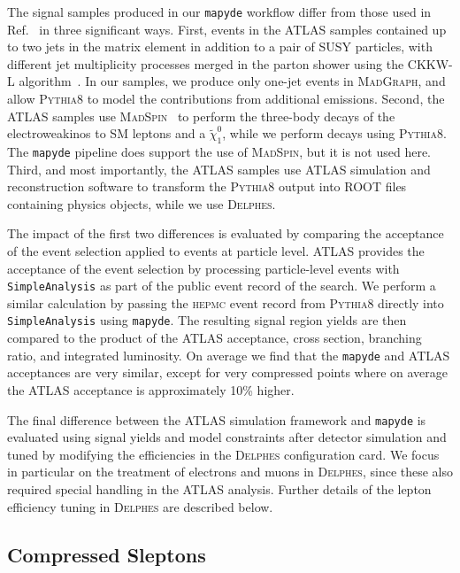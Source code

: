 \documentclass{article}
\newcommand{\chioz}{\ensuremath{\widetilde{\chi}_{1}^{0}}}
\newcommand{\mapyde}{\texttt{mapyde}}
\newcommand{\simpleanalysis}{\texttt{SimpleAnalysis}}
\newcommand{\madgraph}{\textsc{MadGraph}}
\newcommand{\madspin}{\textsc{MadSpin}}
\newcommand{\pythia}{\textsc{Pythia8}}
\newcommand{\delphes}{\textsc{Delphes}}
\newcommand{\hepmc}{\textsc{hepmc}}
\begin{document}
The signal samples produced in our \mapyde{} workflow differ from those used in Ref.~\cite{ATLAS:2019lng} in three significant ways.  First, events in the ATLAS samples contained up to two jets in the matrix element in addition to a pair of SUSY particles, with different jet multiplicity processes merged in the parton shower using the CKKW-L algorithm~\cite{Lonnblad:2011xx}.  In our samples, we produce only one-jet events in \madgraph, and allow \pythia{} to model the contributions from additional emissions.  Second, the ATLAS samples use \madspin{}~\cite{Artoisenet:2012st} to perform the three-body decays of the electroweakinos to SM leptons and a \chioz, while we perform decays using \pythia.  The \mapyde{} pipeline does support the use of \madspin, but it is not used here.  Third, and most importantly, the ATLAS samples use ATLAS simulation and reconstruction software to transform the \pythia{} output into ROOT files containing physics objects, while we use \delphes.

The impact of the first two differences is evaluated by comparing the acceptance of the event selection applied to events at particle level.  ATLAS provides the acceptance of the event selection by processing particle-level events with \simpleanalysis{} as part of the public event record of the search.  We perform a similar calculation by passing the \hepmc{} event record from \pythia{} directly into \simpleanalysis{} using \mapyde.  The resulting signal region yields are then compared to the product of the ATLAS acceptance, cross section, branching ratio, and integrated luminosity.  On average we find that the \mapyde{} and ATLAS acceptances are very similar, except for very compressed points where on average the ATLAS acceptance is approximately 10\% higher.

The final difference between the ATLAS simulation framework and \mapyde{} is evaluated using signal yields and model constraints after detector simulation and tuned by modifying the efficiencies in the \delphes{} configuration card.  We focus in particular on the treatment of electrons and muons in \delphes, since these also required special handling in the ATLAS analysis.  Further details of the lepton efficiency tuning in \delphes{} are described below.

\subsection{Compressed Sleptons}
\label{ssec:compressed-sleptons}
\end{document}
